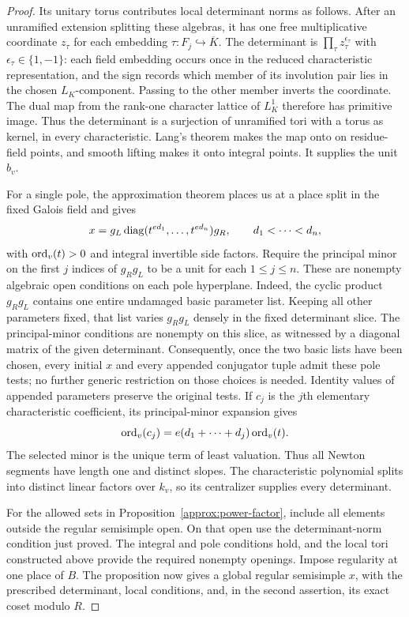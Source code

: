 \begin{proof}
Its unitary torus contributes local determinant norms as follows.
After an unramified extension splitting these algebras, it has one
free multiplicative coordinate $z_\tau$ for each embedding
$\tau:F_j\hookrightarrow\overline K$.  The determinant is
$\prod_\tau z_\tau^{\epsilon_\tau}$ with
$\epsilon_\tau\in\{1,-1\}$: each field embedding occurs once in the
reduced characteristic representation, and the sign records which
member of its involution pair lies in the chosen $L_K$-component.
Passing to the other member inverts the coordinate.  The dual map from the rank-one
character lattice of $L_K^1$ therefore has primitive image.  Thus the
determinant is a surjection of unramified tori with a torus as kernel,
in every characteristic.  Lang's theorem makes the map onto on
residue-field points, and smooth lifting makes it onto integral
points.  It supplies the unit $b_v$.

For a single pole, the approximation theorem places us at a place split
in the fixed Galois field and gives
\[
 x=g_L\operatorname{diag}(t^{e d_1},\ldots,t^{e d_n})g_R,
 \qquad d_1<\cdots<d_n,
\]
with $\operatorname{ord}_v(t)>0$ and integral invertible side factors.
Require the principal minor on the first $j$ indices of $g_Rg_L$ to
be a unit for each $1\leq j\leq n$.  These are nonempty algebraic open
conditions on each pole hyperplane.  Indeed, the cyclic product
$g_Rg_L$ contains one entire undamaged basic parameter list.  Keeping
all other parameters fixed, that list varies $g_Rg_L$ densely in the
fixed determinant slice.  The principal-minor conditions are nonempty
on this slice, as witnessed by a diagonal matrix of the given
determinant.  Consequently, once the two basic lists have been chosen,
every initial $x$ and every appended conjugator tuple admit these
pole tests; no further generic restriction on those choices is needed.
Identity values of appended parameters preserve the original tests.
If $c_j$ is the $j$th elementary characteristic coefficient, its principal-minor expansion gives
\begin{equation}\label{quo:pole-slopes}
 \operatorname{ord}_v(c_j)=e(d_1+\cdots+d_j)\operatorname{ord}_v(t).
\end{equation}
The selected minor is the unique term of least valuation.  Thus all
Newton segments have length one and distinct slopes.  The
characteristic polynomial splits into distinct linear factors over
$k_v$, so its centralizer supplies every determinant.

For the allowed sets in Proposition~\ref{approx:power-factor}, include
all elements outside the regular semisimple open.  On that open use
the determinant-norm condition just proved.  The integral and pole
conditions hold, and the local tori constructed above provide the
required nonempty openings.  Impose regularity at one place of $B$.
The proposition now gives a global regular semisimple $x$, with the
prescribed determinant, local conditions, and, in the second assertion,
its exact coset modulo $R$.


\end{proof}

